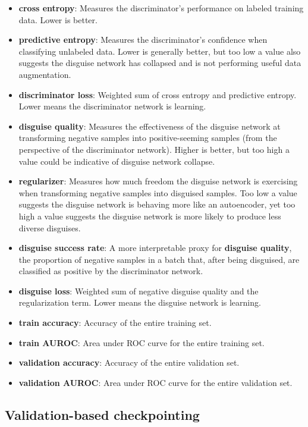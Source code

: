 \documentclass{proc}
\begin{document}
\begin{itemize}
\item{\textbf{cross entropy}}: Measures the discriminator's performance on labeled training data. Lower is better.
\item{\textbf{predictive entropy}}: Measures the discriminator's confidence when classifying unlabeled data. Lower is generally better, but too low a value also suggests the disguise network has collapsed and is not performing useful data augmentation.
\item{\textbf{discriminator loss}}: Weighted sum of cross entropy and predictive entropy. Lower means the discriminator network is learning.
\item{\textbf{disguise quality}}: Measures the effectiveness of the disguise network at transforming negative samples into positive-seeming samples (from the perspective of the discriminator network). Higher is better, but too high a value could be indicative of disguise network collapse.
\item{\textbf{regularizer}}: Measures how much freedom the disguise network is exercising when transforming negative samples into disguised samples. Too low a value suggests the disguise network is behaving more like an autoencoder, yet too high a value suggests the disguise network is more likely to produce less diverse disguises.
\item{\textbf{disguise success rate}}: A more interpretable proxy for \textbf{disguise quality}, the proportion of negative samples in a batch that, after being disguised, are classified as positive by the discriminator network.
\item{\textbf{disguise loss}}: Weighted sum of negative disguise quality and the regularization term. Lower means the disguise network is learning.
\item{\textbf{train accuracy}}: Accuracy of the entire training set.
\item{\textbf{train AUROC}}: Area under ROC curve for the entire training set.
\item{\textbf{validation accuracy}}: Accuracy of the entire validation set.
\item{\textbf{validation AUROC}}: Area under ROC curve for the entire validation set.
\end{itemize}

\subsection{Validation-based checkpointing}
\end{document}
